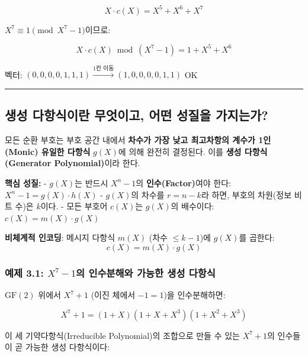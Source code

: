 \documentclass[
  oneside]{article}
\begin{document}
\[X \cdot c(X) = X^5 + X^6 + X^7\]

\(X^7 \equiv 1 \pmod{X^7 - 1}\)이므로:

\[X \cdot c(X) \bmod (X^7 - 1) = 1 + X^5 + X^6\]

벡터:
\((0, 0, 0, 0, 1, 1, 1) \xrightarrow{\text{1칸 이동}} (1, 0, 0, 0, 0, 1, 1)\)
OK

\begin{center}\rule{0.5\linewidth}{0.5pt}\end{center}

\subsection{생성 다항식이란 무엇이고, 어떤 성질을
가지는가?}\label{uxc0dduxc131-uxb2e4uxd56duxc2dduxc774uxb780-uxbb34uxc5c7uxc774uxace0-uxc5b4uxb5a4-uxc131uxc9c8uxc744-uxac00uxc9c0uxb294uxac00}

모든 순환 부호는 부호 공간 내에서 \textbf{차수가 가장 낮고 최고차항의
계수가 1인(Monic) 유일한 다항식} \(g(X)\)에 의해 완전히 결정된다. 이를
\textbf{생성 다항식(Generator Polynomial)}이라 한다.

\textbf{핵심 성질:} - \(g(X)\)는 반드시 \(X^n - 1\)의
\textbf{인수(Factor)}여야 한다: \(X^n - 1 = g(X) \cdot h(X)\) -
\(g(X)\)의 차수를 \(r = n - k\)라 하면, 부호의 차원(정보 비트 수)은
\(k\)이다. - 모든 부호어 \(c(X)\)는 \(g(X)\)의 배수이다:
\(c(X) = m(X) \cdot g(X)\)

\textbf{비체계적 인코딩}: 메시지 다항식 \(m(X)\) (차수 \(\leq k-1\))에
\(g(X)\)를 곱한다: \[c(X) = m(X) \cdot g(X)\]

\subsubsection{\texorpdfstring{예제 3.1: \(X^7 - 1\)의 인수분해와 가능한
생성
다항식}{예제 3.1: X\^{}7 - 1의 인수분해와 가능한 생성 다항식}}\label{uxc608uxc81c-3.1-x7---1uxc758-uxc778uxc218uxbd84uxd574uxc640-uxac00uxb2a5uxd55c-uxc0dduxc131-uxb2e4uxd56duxc2dd}

\(\text{GF}(2)\) 위에서 \(X^7 + 1\) (이진 체에서 \(-1 = 1\))을
인수분해하면:

\[X^7 + 1 = (1 + X)(1 + X + X^3)(1 + X^2 + X^3)\]

이 세 기약다항식(Irreducible Polynomial)의 조합으로 만들 수 있는
\(X^7 + 1\)의 인수들이 곧 가능한 생성 다항식이다:
\end{document}
